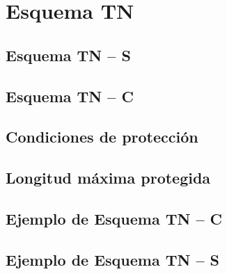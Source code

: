 \chapter{Esquema TN}
\section{Esquema TN – S}
\section{Esquema TN – C}
\section{Condiciones de protección}
\section{Longitud máxima protegida}
\section{Ejemplo de Esquema TN – C}
\section{Ejemplo de Esquema TN – S}